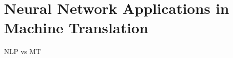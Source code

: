 \section{Neural Network Applications in Machine Translation}
\label{sect:neural-network-applications-in-machine-translation}
NLP vs MT

\newpage